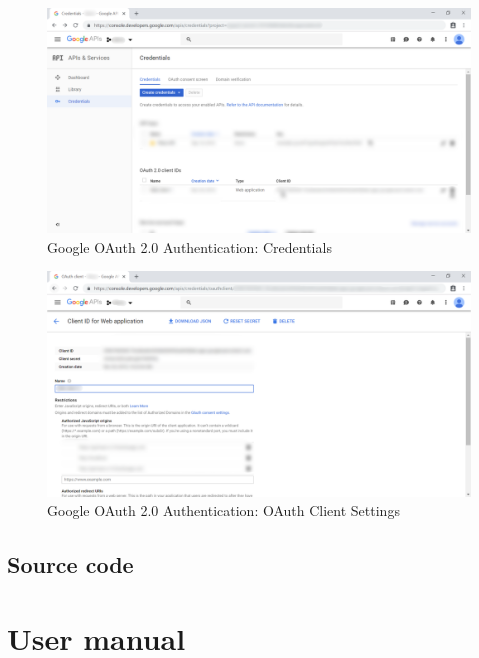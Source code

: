 \begin{enumerate}
	      \begin{center}
	      	\begin{figure}[H]
	      		\centering
	      		\includegraphics[width=0.6\columnwidth]{images/appendixA/Google-OAuth-Credentials.png}
	      		\caption{Google OAuth 2.0 Authentication: Credentials}
	      	\end{figure}
	      \end{center}
	      \begin{center}
	      	\begin{figure}[H]
	      		\centering
	      		\includegraphics[width=0.6\columnwidth]{images/appendixA/Google-OAuth-Settings.png}
	      		\caption{Google OAuth 2.0 Authentication: OAuth Client Settings}
	      	\end{figure}
	      \end{center}
\end{enumerate}
\section{Source code}
\chapter{User manual}
